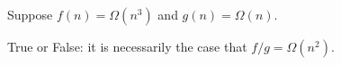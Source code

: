 \begin{prob}

    Suppose $f(n) = \Omega(n^3)$ and $g(n) = \Omega(n)$.

    True or False: it is necessarily the case that $f/g = \Omega(n^2)$.

    \tF{}

\end{prob}
